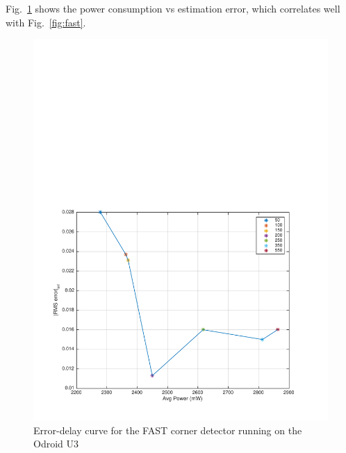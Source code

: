 Fig.~\ref{fig:fastErrVsPower} shows the power consumption vs estimation error, which correlates well with Fig.~\ref{fig:fast}.
\begin{figure}[t]
	\centering
	\includegraphics[width=0.7\linewidth]{figures/errVsPower}
	\caption{Error-delay curve for the FAST corner detector running on the Odroid U3}
	\label{fig:fastErrVsPower}
\end{figure}

